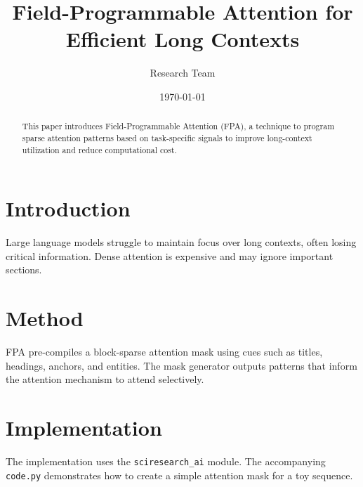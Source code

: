 \documentclass{article}
\title{Field-Programmable Attention for Efficient Long Contexts}
\author{Research Team}
\date{\today}
\begin{document}
\maketitle

\begin{abstract}
This paper introduces Field-Programmable Attention (FPA), a technique to program sparse attention patterns based on task-specific signals to improve long-context utilization and reduce computational cost.
\end{abstract}

\section{Introduction}
Large language models struggle to maintain focus over long contexts, often losing critical information. Dense attention is expensive and may ignore important sections.

\section{Method}
FPA pre-compiles a block-sparse attention mask using cues such as titles, headings, anchors, and entities. The mask generator outputs patterns that inform the attention mechanism to attend selectively.

\section{Implementation}
The implementation uses the \texttt{sciresearch\_ai} module. The accompanying \texttt{code.py} demonstrates how to create a simple attention mask for a toy sequence.
\end{document}
